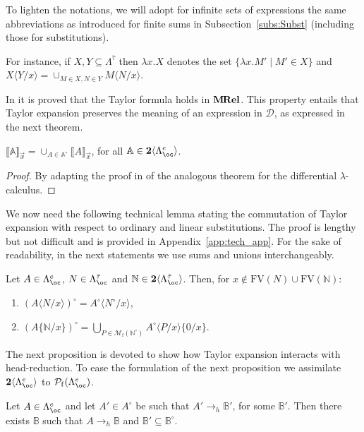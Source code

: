 \documentclass{LMCS}
\newcommand{\bool}{\mathbf{2}}
\newcommand{\st}{ \mid }
\newcommand{\MRel}{\bold{M\hspace{-1pt}Rel}}
\newcommand{\Powf}[1]{\cP_{\mathrm{f}}(#1)}
\newcommand{\lam}{\ensuremath{\lambda}}
\newcommand{\bang}{\oc}
\newcommand{\FV}{\mathrm{FV}}
\newcommand{\Set}[1]{\Lambda^{#1}}
\newcommand{\FSet}[1]{\Lambda^{#1}_{\bang}}
\newcommand{\Fsums}[1]{\bool\langle\FSet{#1}\rangle}
\newcommand{\msto}{\twoheadrightarrow}
\newcommand{\toh}{\to_{h}}\newcommand{\mstoh}{\msto_{h}}\newcommand{\lsubst}[2]{\langle #2 / #1 \rangle}	\newcommand{\llsubst}[2]{\langle\!\langle #2 / #1 \rangle\!\rangle}
\newcommand{\subst}[2]{\{ #2 / #1 \}}	\newcommand{\dg}[2]{\mathrm{deg}_{#1}(#2)} \newcommand{\obsle}{\sqsubseteq_{\mathcal{O}}}
\newcommand{\TE}[1]{#1^{\circ}} \newcommand{\at}{\!::\!}
\newcommand{\Int}[1]{\llbracket #1\rrbracket} \newcommand{\trm}[1]{#1^{\textrm{--}}}
\newcommand{\Mfin}[1]{\mathcal{M}_{\mathrm{f}}(#1)}
\newcommand{\seq}[1]{\vec{#1}}
\newcommand{\sA}{\mathbb{A}}
\newcommand{\sB}{\mathbb{B}}
\newcommand{\sN}{\mathbb{N}}
\newcommand{\gto}{\ensuremath{\bar\tau}}
\newcommand{\cD}{\mathcal{D}}
\newcommand{\cP}{\mathcal{P}}
\begin{document}
\begin{conv} To lighten the notations, we will adopt for infinite sets of expressions the same 
abbreviations as introduced for finite sums in Subsection~\ref{subs:Subst} (including those for substitutions).
\end{conv}
For instance, if $X,Y\subseteq \Set{\gto}$ then $\lam x.X$ denotes the set $\{\lam x.M'\st M'\in X\}$
and $X\lsubst{x}{Y}=\cup_{M\in X,N\in Y} M\lsubst{x}{N}$.


In \cite{Manzonetto10} it is proved that the Taylor formula holds in $\MRel$.
This property entails that Taylor expansion preserves the meaning of an
expression in $\cD$, as expressed in the next theorem.

\begin{thm}\label{thm:DmodelsTE}
$\Int{\sA}_{\seq x} = \cup_{A\in\TE{\sA}}\Int{A}_{\seq x}$, for all $\sA\in\Fsums{e}$.
\end{thm}

\begin{proof}
By adapting the proof in \cite{Manzonetto10} of the analogous theorem for the differential $\lam$-calculus.
\end{proof}

We now need the following technical lemma stating the commutation of 
Taylor expansion with respect to ordinary and linear substitutions.
The proof is lengthy but not difficult and is provided in Appendix~\ref{app:tech_app}.
For the sake of readability, in the next statements we use sums and unions interchangeably.

\begin{lem}\label{lemma:TEcommutesubsts} 
Let $A\in\FSet{e}$, $N\in\FSet{\gto}$ and $\sN\in\Fsums{\gto}$. Then, for $x\notin\FV(N)\cup\FV(\sN)$:
\begin{enumerate}[\em(i)]
\item\label{lemma:TEcommutesubsts1} 
	$\TE{(A\lsubst{x}{N})} = \TE{A}\lsubst{x}{\TE{N}}$,
\item\label{lemma:TEcommutesubsts2} 
	$\TE{(A\subst{x}{\sN})} = \bigcup_{P\in\Mfin{\TE{\sN}}}\TE{A}\lsubst{x}{P}\subst{x}{0}$.
\end{enumerate}
\end{lem}

The next proposition is devoted to show how Taylor expansion interacts with
head-reduction. To ease the formulation of the next proposition we assimilate $\Fsums{e}$ to $\Powf{\FSet{e}}$.

\begin{prop}\label{prop:magic}
Let $A\in\FSet{e}$ and let $A'\in\TE{A}$ be such that $A'\toh\sB'$, for some $\sB'$. 
Then there exists $\sB$ such that $A\toh\sB$ and $\sB'\subseteq\TE{\sB}$.
\end{prop} 
\end{document}

